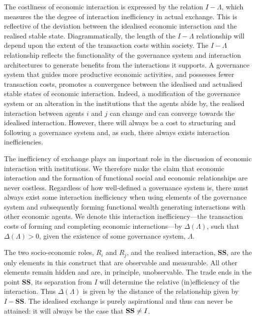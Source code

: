 The costliness of economic interaction is expressed by the relation $I-\Lambda$, which measures the the degree of interaction inefficiency in actual exchange. This is reflective of the deviation between the idealised economic interaction and the realised stable state. Diagrammatically, the length of the $I-\Lambda$ relationship will depend upon the extent of the transaction costs within society. The $I-\Lambda$ relationship reflects the functionality of the governance system and interaction architectures to generate benefits from the interactions it supports. A governance system that guides more productive economic activities, and possesses fewer transaction costs, promotes a convergence between the idealised and actualised stable states of economic interaction. Indeed, a modification of the governance system or an alteration in the institutions that the agents abide by, the realised interaction between agents $i$ and $j$ can change and can converge towards the idealised interaction. However, there will always be a cost to structuring and following a governance system and, as such, there always exists interaction inefficiencies.

The inefficiency of exchange plays an important role in the discussion of economic interaction with institutions. We therefore make the claim that economic interaction and the formation of functional social and economic relationships are never costless. Regardless of how well-defined a governance system is, there must always exist some interaction inefficiency when using elements of the governance system and subsequently forming functional wealth generating interactions with other economic agents. We denote this interaction inefficiency---the transaction costs of forming and completing economic interactions---by $\Delta(\Lambda)$, such that $\Delta(\Lambda) > 0$, given the existence of some governance system, $\Lambda$.

The two socio-economic roles, $R_{i}$ and $R_{j}$, and the realised interaction, \textbf{SS}, are the only elements in this construct that are observable and measurable. All other elements remain hidden and are, in principle, unobservable. The trade ends in the point \textbf{SS}, its separation from $I$ will determine the relative (in)efficiency of the interaction. Thus $\Delta(\Lambda)$ is given by the distance of the relationship given by $I-\mathbf{SS}$. The idealised exchange is purely aspirational and thus can never be attained: it will always be the case that $\mbox{\textbf{SS}} \neq I$.

